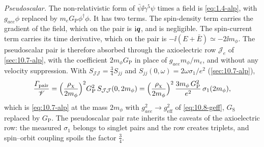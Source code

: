 \emph{Pseudoscalar.} The non-relativistic form of $\bar\psi\ii\gamma^5\psi$ times a field is \cref{eq:1.4-alp}, with $g_{aee}\phi$ replaced by $m_eG_{\mathrm{P}}\phi^\dagger\phi$. It has two terms. The spin-density term carries the gradient of the field, which on the pair is $\mathrm{i}\bm{q}$, and is negligible. The spin-current term carries its time derivative, which on the pair is $-\ii(E + \bar E) \simeq -2\ii m_\phi$. The pseudoscalar pair is therefore absorbed through the axioelectric row $\mathcal{J}_e$ of \cref{sec:10.7-alp}, with the coefficient $2m_\phi G_{\mathrm{P}}$ in place of $g_{aee}m_\phi/m_e$, and without any velocity suppression. With $S_{\mathcal{J}\mathcal{J}} = \frac34S_{jj}$ and $S_{jj}(0, \omega) = 2\omega\sigma_1/e^2$ (\cref{sec:10.7-alp}),
\begin{equation}
  \frac{\varGamma_{\mathrm{pair}}}{\mathscr{V}} = \Bigl(\frac{\rho_\chi}{2m_\phi}\Bigr)^2G_{\mathrm{P}}^2\,S_{\mathcal{J}\mathcal{J}}(0, 2m_\phi) = \Bigl(\frac{\rho_\chi}{2m_\phi}\Bigr)^2\,\frac{3m_\phi\,G_{\mathrm{P}}^2}{e^2}\,\sigma_1(2m_\phi) ,
  \label{eq:10.8-P}
\end{equation}
which is \cref{eq:10.7-alp} at the mass $2m_\phi$ with $g_{aee}^2 \to g_{\mathrm{eff}}^2$ of \cref{eq:10.8-geff}, $G_{\mathrm{S}}$ replaced by $G_{\mathrm{P}}$. The pseudoscalar pair rate inherits the caveats of the axioelectric row: the measured $\sigma_1$ belongs to singlet pairs and the row creates triplets, and spin--orbit coupling spoils the factor $\frac34$.

